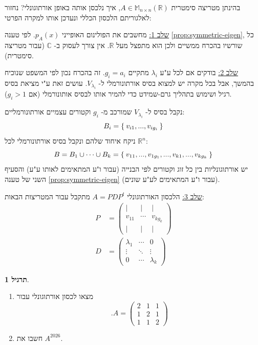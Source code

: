 \documentclass[12pt]{report}
\theoremstyle{plain}
\theoremstyle{definition}
\newtheorem{exercise}{תרגיל}[chapter]
\newcommand{\R}{\mathbb{R}}
\newcommand{\C}{\mathbb{C}}
\newcommand{\M}{\mathbb{M}}
\newcommand{\0}{\mathbf{0}}
\begin{document}
בהינתן מטריצה סימטרית
$A\in\M_{n\times n}(\R)$,
איך נלכסן אותה באופן אורתוגונלי? נחזור לאלגוריתם הלכסון הכללי ונעדכן אותו למקרה הפרטי:

\underline{שלב 1:}
מחשבים את הפולינום האופייני
$p_A(x)$.
לפי טענה
\ref{prop:symmetric-eigen},
כל שורשיו בהכרח ממשיים ולכן הוא מתפצל מעל
$\R$.
אין צורך לעסוק ב-
$\C$
(עבור מטריצה סימטרית).

\underline{שלב 2:}
בודקים אם לכל ע"ע 
$\lambda_i$
מתקיים
$g_i=a_i$.
זה בהכרח נכון לפי המשפט שנוכיח בהמשך, אבל בכל מקרה יש למצוא בסיס אורתונורמלי ל-
$V_{\lambda_i}$.
עושים זאת ע"י מציאת בסיס רגיל ושימוש בתהליך גרם-שמידט כדי להמיר אותו לבסיס אותונורמלי (אם
$g_i>1$).

נקבל בסיס ל-
$V_{\lambda_i}$
שמורכב מ-
$g_i$
וקטורים עצמיים אורתונורמליים:
$$
B_i=\Set{v_{i1},...,v_{ig_i}}
$$
ניקח איחוד שלהם ונקבל בסיס אורתונורמלי 
לכל
$\R^n$:
$$
B=B_1\cup \cdots \cup B_k=\Set{v_{11},...,v_{1g_1},...,v_{k1},...,v_{kg_k}}
$$
יש אורתוגונליות בין כל זוג וקטורים לפי הבנייה (עבור ו"ע המתאימים לאותו ע"ע) והסעיף השני של טענה
\ref{prop:symmetric-eigen}
(עבור ו"ע המתאימים לע"ע שונים).

\underline{שלב 3:}
הלכסון האורתוגונלי 
$A=PDP^t$
מתקבל עבור המטריצות הבאות:
$$
\begin{aligned}
P&=\begin{pmatrix}
\big| & \big|        & \big| \\
v_{11} & \cdots & v_{kg_k} \\
\big| & \big|         & \big|
\end{pmatrix}\\
D&=\begin{pmatrix}
\lambda_1 & \cdots & 0 \\
\vdots & \ddots & \vdots \\
0  & \cdots & \lambda_k
\end{pmatrix}
\end{aligned}
$$

\begin{exercise}
\begin{enumerate}[label=\alph*.]
\item
מצאו לכסון אורתוגונלי עבור
$$
.A=\begin{pmatrix}
2 & 1 & 1 \\
1 & 2 & 1 \\
1 & 1 & 2
\end{pmatrix}
$$


\item 
חשבו את
$A^{2026}$.


\end{enumerate}
\end{exercise}
\end{document}
